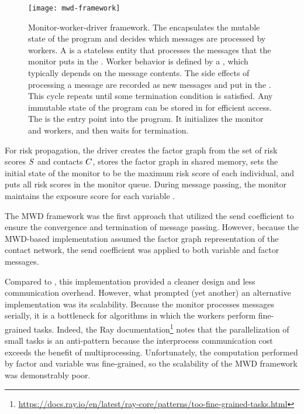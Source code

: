\begin{figure}[htbp]
\centering
\texttt{[image: mwd-framework]}
\caption[Monitor-worker-driver framework]{Monitor-worker-driver framework. The  encapsulates the mutable state of the program and decides which messages are processed by workers. A  is a stateless entity that processes the messages that the monitor puts in the . Worker behavior is defined by a , which typically depends on the message contents. The side effects of processing a message are recorded as new messages and put in the . This cycle repeats until some termination condition is satisfied. Any immutable state of the program can be stored in  for efficient access. The  is the entry point into the program. It initializes the monitor and workers, and then waits for termination.}
\label{fig:mwd-framework}
\end{figure}

For risk propagation, the driver creates the factor graph from the set of risk scores $S$ and contacts $C$, stores the factor graph in shared memory, sets the initial state of the monitor to be the maximum risk score of each individual, and puts all risk scores in the monitor queue. During message passing, the monitor maintains the exposure score for each variable \vertexName.

The MWD framework was the first approach that utilized the send coefficient to ensure the convergence and termination of message passing. However, because the MWD-based implementation assumed the factor graph representation of the contact network, the send coefficient was applied to both variable and factor messages.

Compared to , this implementation provided a cleaner design and less communication overhead. However, what prompted (yet another) an alternative implementation was its scalability. Because the monitor processes messages serially, it is a bottleneck for algorithms in which the workers perform fine-grained tasks. Indeed, the Ray documentation\footnote{\url{https://docs.ray.io/en/latest/ray-core/patterns/too-fine-grained-tasks.html}} notes that the parallelization of small tasks is an anti-pattern because the interprocess communication cost exceeds the benefit of multiprocessing. Unfortunately, the computation performed by factor \verticesName{} and variable \verticesName{} was fine-grained, so the scalability of the MWD framework was demonstrably poor.

